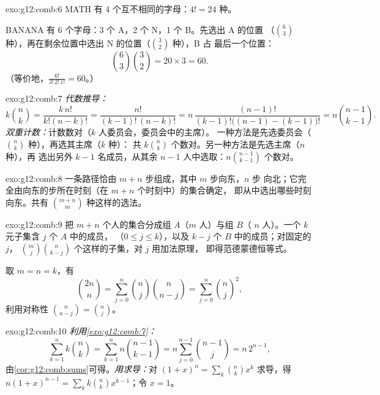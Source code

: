 \begin{solution}{exo:g12:comb:6}
MATH 有 4 个互不相同的字母：$4! = 24$ 种。

BANANA 有 6 个字母：3 个 A，2 个 N，1 个 B。先选出 A 的位置
（$\binom63$ 种），再在剩余位置中选出 N 的位置（$\binom32$ 种），B 占
最后一个位置：
\[
\binom{6}{3}\binom{3}{2} = 20 \times 3 = 60 .
\]
（等价地，$\frac{6!}{3!\,2!\,1!} = 60$。）
\end{solution}

\begin{solution}{exo:g12:comb:7}
\emph{代数推导：}
\[
k\binom nk = \frac{k\,n!}{k!(n-k)!} = \frac{n!}{(k-1)!\,(n-k)!}
= n\,\frac{(n-1)!}{(k-1)!\bigl((n-1)-(k-1)\bigr)!} = n\binom{n-1}{k-1}.
\]
\emph{双重计数：}计数数对（$k$ 人委员会，委员会中的主席）。
一种方法是先选委员会（$\binom nk$ 种），再选其主席（$k$ 种）：
共 $k\binom nk$ 个数对。另一种方法是先选主席（$n$ 种），再
选出另外 $k-1$ 名成员，从其余 $n-1$ 人中选取：$n\binom{n-1}{k-1}$ 个数对。
\end{solution}

\begin{solution}{exo:g12:comb:8}
一条路径恰由 $m + n$ 步组成，其中 $m$ 步向东，$n$ 步
向北；它完全由向东的步所在时刻（在 $m+n$ 个时刻中）的集合确定，
即从中选出哪些时刻向东。共有 $\binom{m+n}{m}$ 种这样的选法。
\end{solution}

\begin{solution}{exo:g12:comb:9}
把 $m + n$ 个人的集合分成组 $A$（$m$ 人）与组 $B$（
$n$ 人）。一个 $k$ 元子集含 $j$ 个 $A$ 中的成员，
（$0 \leq j \leq k$），以及 $k - j$ 个 $B$ 中的成员；对固定的 $j$，
$\binom mj \binom{n}{k-j}$ 个这样的子集，对 $j$ 用加法原理，
即得范德蒙德恒等式。

取 $m = n = k$，有
\[
\binom{2n}{n} = \sum_{j=0}^n \binom nj \binom{n}{n-j}
= \sum_{j=0}^n \binom nj^{2},
\]
利用对称性 $\binom{n}{n-j} = \binom nj$。
\end{solution}

\begin{solution}{exo:g12:comb:10}
\emph{利用\cref{exo:g12:comb:7}：}
\[
\sum_{k=1}^n k\binom nk = \sum_{k=1}^n n\binom{n-1}{k-1}
= n\sum_{j=0}^{n-1}\binom{n-1}{j} = n\,2^{n-1},
\]
由\cref{cor:g12:comb:sums}可得。\emph{用求导：}对
$(1+x)^n = \sum_k \binom nk x^k$ 求导，得
$n(1+x)^{n-1} = \sum_k k \binom nk x^{k-1}$；令 $x = 1$。
\end{solution}

